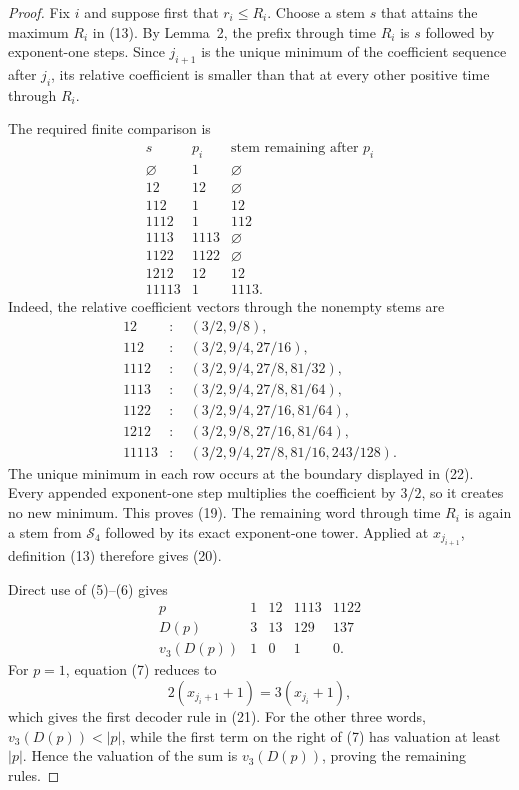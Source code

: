 \documentclass[11pt]{article}
\begin{document}
\begin{proof}
Fix $i$ and suppose first that $r_i\leq R_i$.  Choose a stem $s$ that
attains the maximum $R_i$ in (13).  By Lemma~2, the prefix through time
$R_i$ is $s$ followed by exponent-one steps.  Since $j_{i+1}$ is the
unique minimum of the coefficient sequence after $j_i$, its relative
coefficient is smaller than that at every other positive time through
$R_i$.

The required finite comparison is
\[
  \begin{array}{c|c|c}
    s& p_i&\text{stem remaining after }p_i\\ \hline
    \varnothing&1&\varnothing\\
    12&12&\varnothing\\
    112&1&12\\
    1112&1&112\\
    1113&1113&\varnothing\\
    1122&1122&\varnothing\\
    1212&12&12\\
    11113&1&1113.
  \end{array}
  \tag{22}
\]
Indeed, the relative coefficient vectors through the nonempty stems are
\[
\begin{aligned}
12&:\quad (3/2,9/8),\\
112&:\quad (3/2,9/4,27/16),\\
1112&:\quad (3/2,9/4,27/8,81/32),\\
1113&:\quad (3/2,9/4,27/8,81/64),\\
1122&:\quad (3/2,9/4,27/16,81/64),\\
1212&:\quad (3/2,9/8,27/16,81/64),\\
11113&:\quad (3/2,9/4,27/8,81/16,243/128).
\end{aligned}
\tag{23}
\]
The unique minimum in each row occurs at the boundary displayed in (22).
Every appended exponent-one step multiplies the coefficient by $3/2$, so
it creates no new minimum.  This proves (19).  The remaining word through
time $R_i$ is again a stem from $\mathcal S_4$ followed by its exact
exponent-one tower.  Applied at $x_{j_{i+1}}$, definition (13) therefore
gives (20).

Direct use of (5)--(6) gives
\[
  \begin{array}{c|rrrr}
    p&1&12&1113&1122\\ \hline
    D(p)&3&13&129&137\\
    v_3(D(p))&1&0&1&0.
  \end{array}
  \tag{24}
\]
For $p=1$, equation (7) reduces to
\[
  2(x_{j_i+1}+1)=3(x_{j_i}+1),
\]
which gives the first decoder rule in (21).  For the other three words,
$v_3(D(p))<|p|$, while the first term on the right of (7) has valuation at
least $|p|$.  Hence the valuation of the sum is $v_3(D(p))$, proving the
remaining rules.


\end{proof}
\end{document}
